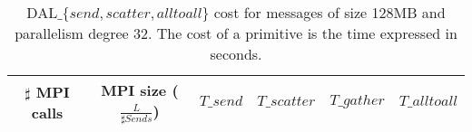 \begin{table}[h]
\begin{center}
\begin{tabular}{|c|c|c|c|c|c|}\hline
\hline
$\sharp$ MPI calls & MPI size ($\frac{L}{\sharp Sends}$)  & $T\_send$   & $T\_scatter$ & $T\_gather$ &  $T\_alltoall$      \\\hline\hline

\end{tabular}
\caption{DAL$\_\lbrace send, scatter, alltoall \rbrace$ cost for messages of size 128MB and parallelism degree 32. The cost of a primitive is the time expressed in seconds.}
\label{tsetup-pcm-n32-M128}
\end{center}
\end{table}
